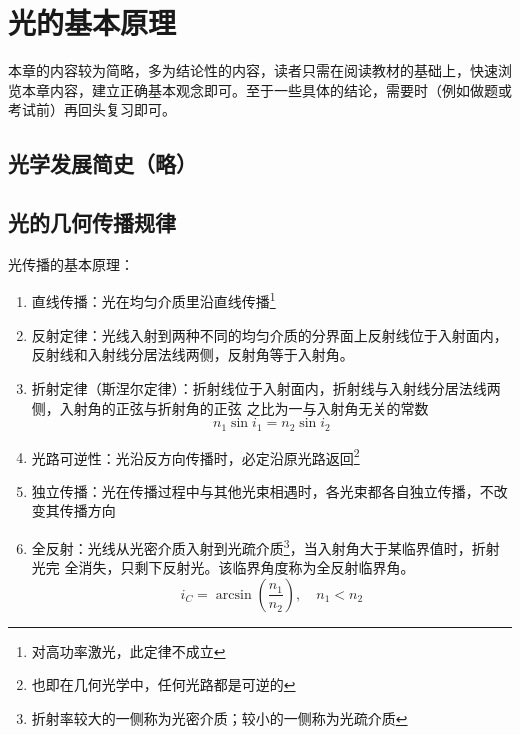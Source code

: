 \documentclass[UTF8]{report}
\theoremstyle{MyLineTheoremStyle} %
\theoremstyle{MyBlockTheoremStyle} %
\theoremstyle{MySubsubsectionStyle} %
\begin{document}
\newpage    
{} 


\chapter{光的基本原理}\thispagestyle{fancy}

本章的内容较为简略，多为结论性的内容，读者只需在阅读教材的基础上，快速浏览本章内容，建立正确基本观念即可。至于一些具体的结论，需要时（例如做题或考试前）再回头复习即可。


\section{光学发展简史（略）}


\section{光的几何传播规律}

光传播的基本原理：
\begin{enumerate}
    \item 直线传播：光在均匀介质里沿直线传播\footnote{对高功率激光，此定律不成立}
    \item 反射定律：光线入射到两种不同的均匀介质的分界面上反射线位于入射面内，反射线和入射线分居法线两侧，反射角等于入射角。
    \item 折射定律（斯涅尔定律）：折射线位于入射面内，折射线与入射线分居法线两侧，入射角的正弦与折射角的正弦
    之比为一与入射角无关的常数
    \begin{equation}
    n_1\sin i_1 = n_2 \sin i_2
    \end{equation}    
    \item 光路可逆性：光沿反方向传播时，必定沿原光路返回\footnote{也即在几何光学中，任何光路都是可逆的}
    \item 独立传播：光在传播过程中与其他光束相遇时，各光束都各自独立传播，不改变其传播方向
    \item 全反射：光线从光密介质入射到光疏介质\footnote{折射率较大的一侧称为光密介质；较小的一侧称为光疏介质}，当入射角大于某临界值时，折射光完
    全消失，只剩下反射光。该临界角度称为全反射临界角。
    \begin{equation}
    i_C = \arcsin \left(\frac{n_1}{n_2}\right),\quad n_1<n_2
    \end{equation}
\end{enumerate}
\end{document}
